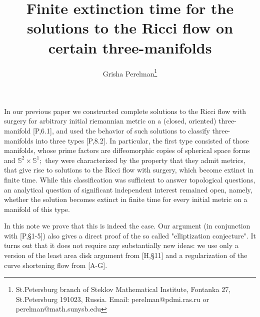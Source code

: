 \documentclass{article}
\begin{document}
\title{Finite extinction time for the solutions to the Ricci flow
on certain three-manifolds}\author{Grisha
Perelman\thanks{St.Petersburg branch of Steklov Mathematical
Institute, Fontanka 27, St.Petersburg 191023, Russia. Email:
perelman@pdmi.ras.ru or perelman@math.sunysb.edu }} \maketitle
\par In our previous paper we constructed complete solutions to
the Ricci flow with surgery for arbitrary initial riemannian
metric on a (closed, oriented) three-manifold [P,6.1], and used
the behavior of such solutions to classify three-manifolds into
three types [P,8.2]. In particular, the first type consisted of
those manifolds, whose prime factors are diffeomorphic copies of
spherical space forms and $\mathbb{S}^2\times\mathbb{S}^1;$ they
were characterized by the property that they admit  metrics, that
give rise to solutions to the Ricci flow with surgery, which
become extinct in finite time. While this classification was
sufficient to answer topological questions, an analytical question
of significant independent interest remained open, namely, whether
the solution becomes extinct in finite time for every initial
metric on a manifold of this type.
\par In this note we prove that this is indeed the case. Our
argument (in conjunction with [P,\S 1-5]) also gives a direct
proof of the so called "elliptization conjecture". It turns out
that it does not require any substantially new ideas: we use only
a version of the least area disk argument from [H,\S 11] and a
regularization of the curve shortening flow from [A-G].
\end{document}
